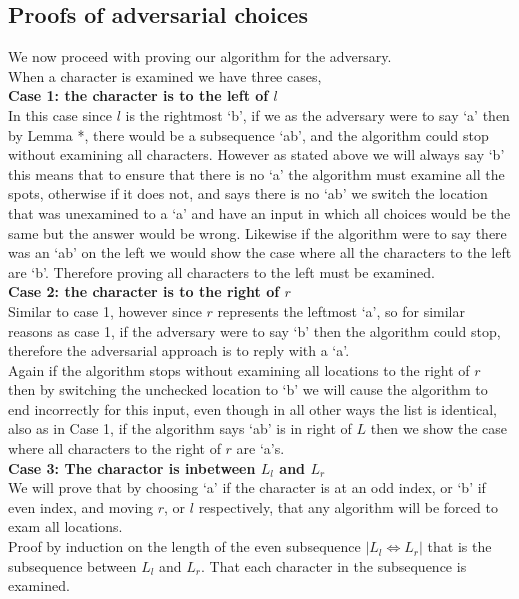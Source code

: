 \documentclass{article}
\begin{document}
    \subsection{Proofs of adversarial choices}
      We now proceed with proving our algorithm for the adversary.\\
      When a character is examined we have three cases, \\
      \textbf{Case 1: the character is to the left of $l$}\\
      In this case since $l$ is the rightmost `b', if we as the adversary were to say `a' then by Lemma *, there would be a subsequence `ab', and the algorithm could stop without examining all characters.
      However as stated above we will always say `b' this means that to ensure that there is no `a' the algorithm must examine all the spots, otherwise if it does not, and says there is no `ab' we switch the location that was unexamined to a `a' and have an input in which all choices would be the same but the answer would be wrong. Likewise if the algorithm were to say there was an `ab' on the left we would show the case where all the characters to the left are `b'. Therefore proving all characters to the left must be examined.\\
      \textbf{Case 2: the character is to the right of $r$}\\
      Similar to case 1, however since $r$ represents the leftmost `a', so for similar reasons as case 1, if the adversary were to say `b' then the algorithm could stop, therefore the adversarial approach is to reply with a `a'.\\
      Again if the algorithm stops without examining all locations to the right of $r$ then by switching the unchecked location to `b' we will cause the algorithm to end incorrectly for this input, even though in all other ways the list is identical, also as in Case 1, if the algorithm says `ab' is in right of $L$ then we show the case where all characters to the right of $r$ are `a's.\\
      \textbf{Case 3: The charactor is inbetween $L_{l}$ and $L_{r}$}\\
      We will prove that by choosing `a' if the character is at an odd index, or `b' if even index, and moving $r$, or $l$ respectively, that any algorithm will be forced to exam all locations.\\
      Proof by induction on the length of the even subsequence $|L_{l} \Leftrightarrow L_{r}|$ that is the subsequence between $L_{l}$ and $L_{r}$. That each character in the subsequence is examined.\\
\end{document}
